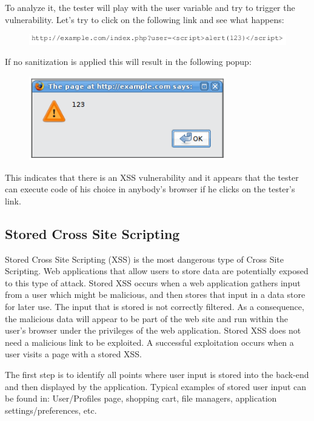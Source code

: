 		To analyze it, the tester will play with the user variable and try to trigger the vulnerability. 
		Let's try to click on the following link and see what happens: 

		\begin{figure}[H]
			\includegraphics[scale=0.5]{pics/link.png}
		\end{figure}
		If no sanitization is applied this will result in the following popup:

		\begin{figure}[H]
			\includegraphics[scale=0.5]{pics/xss2.png}
		\end{figure}

		This indicates that there is an XSS vulnerability and it appears that the tester can execute 
		code of his choice in anybody's browser if he clicks on the tester's link.

	\clearpage
	\subsection{Stored Cross Site Scripting}

		Stored Cross Site Scripting (XSS) is the most dangerous type of Cross Site Scripting. 
		Web applications that allow users to store data are potentially exposed to this type of 
		attack. Stored XSS occurs when a web application gathers input from a user which might 
		be malicious, and then stores that input in a data store for later use. The input that 
		is stored is not correctly filtered. As a consequence, the malicious data will appear
		to be part of the web site and run within the user’s browser under the privileges of the 
		web application. Stored XSS does not need a malicious link to be exploited. 
		A successful exploitation occurs when a user visits a page with a stored XSS.

		The first step is to identify all points where user input is stored into the back-end and 
		then displayed by the application. Typical examples of stored user input can be found in:
		User/Profiles page, shopping cart, file managers, application settings/preferences, etc.

